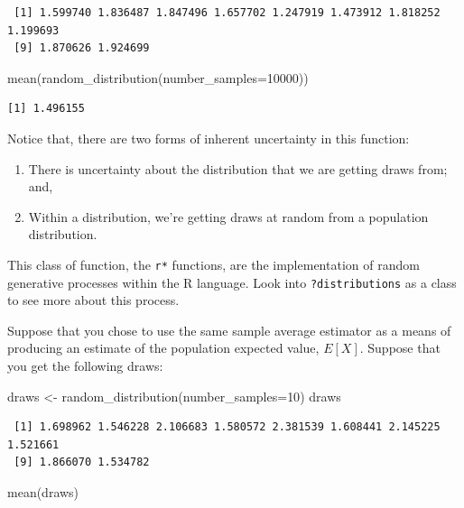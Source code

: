 \documentclass[
  letterpaper,
  DIV=11,
  numbers=noendperiod]{scrreprt}
\newenvironment{Shaded}{\begin{snugshade}}{\end{snugshade}}
\newcommand{\AttributeTok}[1]{\textcolor[rgb]{0.40,0.45,0.13}{#1}}
\newcommand{\DecValTok}[1]{\textcolor[rgb]{0.68,0.00,0.00}{#1}}
\newcommand{\FunctionTok}[1]{\textcolor[rgb]{0.28,0.35,0.67}{#1}}
\newcommand{\NormalTok}[1]{\textcolor[rgb]{0.00,0.23,0.31}{#1}}
\newcommand{\OtherTok}[1]{\textcolor[rgb]{0.00,0.23,0.31}{#1}}
\providecommand{\tightlist}{%
  \setlength{\itemsep}{0pt}\setlength{\parskip}{0pt}}\usepackage{longtable,booktabs,array}
\begin{document}
\begin{verbatim}
 [1] 1.599740 1.836487 1.847496 1.657702 1.247919 1.473912 1.818252 1.199693
 [9] 1.870626 1.924699
\end{verbatim}

\begin{Shaded}
\begin{Highlighting}[]
\FunctionTok{mean}\NormalTok{(}\FunctionTok{random\_distribution}\NormalTok{(}\AttributeTok{number\_samples=}\DecValTok{10000}\NormalTok{))}
\end{Highlighting}
\end{Shaded}

\begin{verbatim}
[1] 1.496155
\end{verbatim}

Notice that, there are two forms of inherent uncertainty in this
function:

\begin{enumerate}
\def\labelenumi{\arabic{enumi}.}
\tightlist
\item
  There is uncertainty about the distribution that we are getting draws
  from; and,
\item
  Within a distribution, we're getting draws at random from a population
  distribution.
\end{enumerate}

This class of function, the \texttt{r*} functions, are the
implementation of random generative processes within the R language.
Look into \texttt{?distributions} as a class to see more about this
process.

Suppose that you chose to use the same sample average estimator as a
means of producing an estimate of the population expected value,
\(E[X]\). Suppose that you get the following draws:

\begin{Shaded}
\begin{Highlighting}[]
\NormalTok{draws }\OtherTok{\textless{}{-}} \FunctionTok{random\_distribution}\NormalTok{(}\AttributeTok{number\_samples=}\DecValTok{10}\NormalTok{)}
\NormalTok{draws}
\end{Highlighting}
\end{Shaded}

\begin{verbatim}
 [1] 1.698962 1.546228 2.106683 1.580572 2.381539 1.608441 2.145225 1.521661
 [9] 1.866070 1.534782
\end{verbatim}

\begin{Shaded}
\begin{Highlighting}[]
\FunctionTok{mean}\NormalTok{(draws)}
\end{Highlighting}
\end{Shaded}
\end{document}
